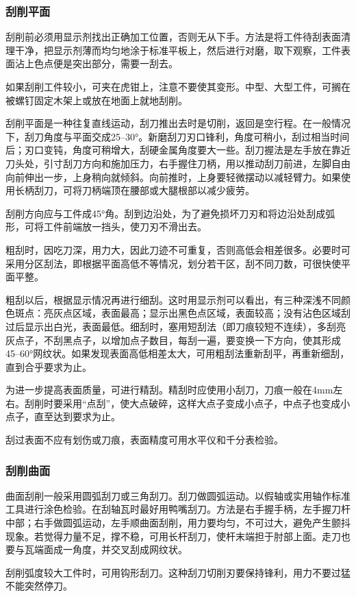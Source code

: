 \documentclass{ctexbook}
\begin{document}
\subsubsection{刮削平面}
刮削前必须用显示剂找出正确加工位置，否则无从下手。方法是将工件待刮表面清理干净，把显示剂薄而均匀地涂于标准平板上，然后进行对磨，取下观察，工件表面沾上色点便是突出部分，需要一刮去。

如果刮削工件较小，可夹在虎钳上，注意不要使其变形。中型、大型工件，可搁在被螺钉固定木架上或放在地面上就地刮削。

刮削平面是一种往复直线运动，刮刀推出去时是切削，返回是空行程。在一般情况下，刮刀角度与平面交成25--30°。新磨刮刀刃口锋利，角度可稍小，刮过相当时间后；刃口变钝，角度可稍增大，刮硬金属角度要大一些。刮刀握法是左手放在靠近刀头处，引寸刮刀方向和施加压力，右手握住刀柄，用以推动刮刀前进，左脚自由向前伸出一步，上身稍向就倾斜。向前推时，上身要轻微摆动以减轻臂力。如果使用长柄刮刀，可将刀柄端顶在腰部或大腿根部以减少疲劳。

刮削方向应与工件成45°角。刮到边沿处，为了避免损坏刀刃和将边沿处刮成弧形，可将工件前端放一挡头，使刀刃不滑出去。

粗刮时，因吃刀深，用力大，因此刀迹不可重复，否则高低会相差很多。必要时可采用分区刮法，即根据平面高低不等情况，划分若干区，刮不同刀数，可很快使平面平整。

粗刮以后，根据显示情况再进行细刮。这时用显示剂可以看出，有三种深浅不同颜色斑点：亮灰点区域，表面最高；显示出黑色点区域，表面较高；没有沾色区域刮过后显示出白光，表面最低。细刮时，塞用短刮法（即刀痕较短不连续），多刮亮灰点子，不刮黑点子，以增加点子数目，每刮一遍，要变换一下方向，使其形成45--60°网纹状。如果发现表面高低相差太大，可用粗刮法重新刮平，再重新细刮，直到合乎要求为止。

为进一步提高表面质量，可进行精刮。精刮时应使用小刮刀，刀痕一般在4mm左右。刮削时要采用“点刮”，使大点破碎，这样大点子变成小点子，中点子也变成小点子，直至达到要求为止。

刮过表面不应有划伤或刀痕，表面精度可用水平仪和千分表检验。
\subsubsection{刮削曲面}
曲面刮削一般采用圆弧刮刀或三角刮刀。刮刀做圆弧运动。以假轴或实用轴作标准工具进行涂色检验。在刮轴瓦时最好用鸭嘴刮刀。方法是右手握手柄，左手握刀杆中部；右手做圆弧运动，左手顺曲面刮削，用力要均匀，不可过大，避免产生颤抖现象。若觉得力量不足，撑不稳，可用长杆刮刀，使杆末端担于肘部上面。走刀也要与瓦端面成一角度，并交叉刮成网纹状。

刮削弧度较大工件时，可用钩形刮刀。这种刮刀切削刃要保持锋利，用力不要过猛不能突然停刀。
\end{document}
